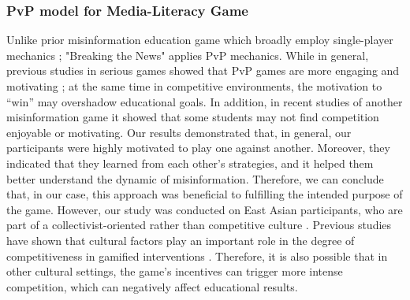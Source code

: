 \subsubsection{PvP model for Media-Literacy Game}
Unlike prior misinformation education game which broadly employ single-player mechanics \cite{roozenbeek2019fake,camCambridgeGame,harmonysquare,jeon2021chamberbreaker}; "Breaking the News" applies PvP mechanics. While in general, previous studies in serious games showed that PvP games are more engaging and motivating \cite{cagiltay2015effect}; at the same time in competitive environments, the motivation to “win” may overshadow educational goals.  In addition, in recent studies of another misinformation game it showed that some students may not find %
competition enjoyable or motivating\cite{axelsson2024bad}. 
Our results demonstrated that, in general, our participants were highly motivated to play one against another. Moreover, they indicated that they learned from each other's strategies, and it helped them better understand the dynamic of misinformation. Therefore, we can conclude that, in our case, this approach was beneficial to fulfilling the intended purpose of the game. 
However, our study was conducted on East Asian participants, who are part of a collectivist-oriented rather than competitive culture \cite{chung1999social}. Previous studies have shown that cultural factors play an important role in the degree of competitiveness in gamified interventions \cite{oyibo2017investigation}. Therefore, it is also possible that in other cultural settings, the game's incentives can trigger more intense competition, which can negatively affect educational results. 






